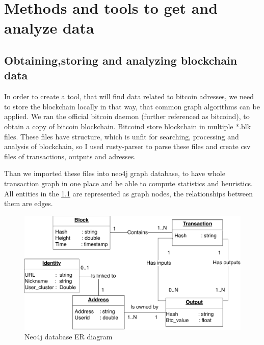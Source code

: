 \documentclass[
  digital, %
  table,   %
  lof,     %
  lot,     %
  oneside
]{fithesis3}
\begin{document}
\chapter{Methods and tools to get and analyze data}
\section{Obtaining,storing and analyzing blockchain data}
In order to create a tool, that will find data related to bitcoin adresses, we need to store the blockchain locally in that way, that common graph algorithms can be applied.
We ran the official bitcoin daemon (further referenced as bitcoind), to obtain a copy of bitcoin blockchain. Bitcoind store blockchain in multiple *.blk files.
These files have structure, which is unfit for searching, processing and analysis of blockchain, so I used rusty-parser to parse these files and create csv files of transactions, outputs and adresses.

Than we imported these files into neo4j graph database, to have whole transaction graph in one place and be able to compute statistics and heuristics.
All entities in the \ref{neo4jschema} are represented as graph nodes, the relationships between them are edges.
\begin{figure}[!htb]
    \centering
    \includegraphics[width=1\textwidth]{neo4j-schema}
    \caption{Neo4j database ER diagram}
    \label{neo4jschema}
\end{figure}
\end{document}
